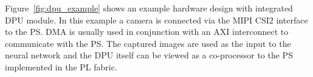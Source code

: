 Figure~\ref{fig:dpu_example} shows an example hardware design with integrated \ac{DPU} module. In this example a camera is connected via the \ac{MIPI} \ac{CSI2} interface to the \ac{PS}. \ac{DMA} is usually used in conjunction with an \ac{AXI} interconnect to communicate with the \ac{PS}. The captured images are used as the input to the neural network and the \ac{DPU} itself can be viewed as a co-processor to the \ac{PS} implemented in the \ac{PL} fabric.